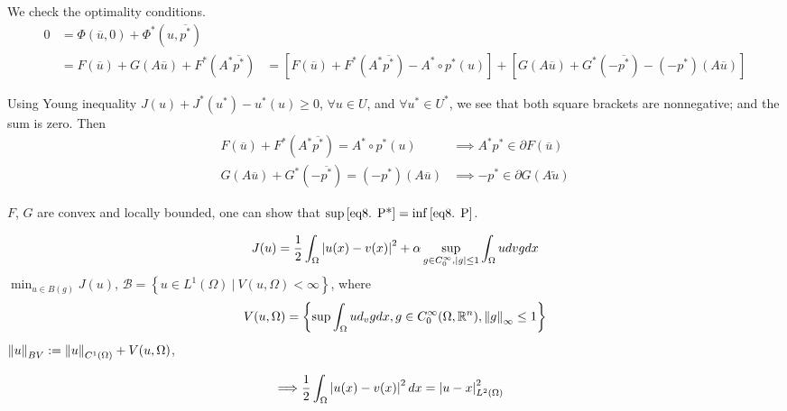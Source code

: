 We check the optimality conditions.
\begin{align*}
	0&=\Phi (\overline{u},0)+\Phi^*(u, \overline{p^*}) \\
	&= F(\overline{u})+G(A\overline{u})+F^*(A^*\overline{p^*})
	&= [F(\overline{u})+F^*(A^*\overline{p^*})-A^*\circ p^*(u)]+[G(A\overline{u})+G^*(-\overline{p^*})-(-p^*)(A\overline{u})]
\end{align*}

Using Young inequality $J(u)+J^*(u^*)-u^*(u)\geq 0$, $\forall u \in U$, and $\forall u^* \in U^*$, we see that both square brackets are nonnegative; and the sum is zero. Then
\begin{align*}
	F(\overline{u})+F^*(A^*\overline{p^*})=A^*\circ p^*(u) &\implies A^*p^* \in \partial F(\overline{u}) \\
	G(A\overline{u})+G^*(-\overline{p^*})=(-p^*)(A\overline{u}) &\implies -p^* \in \partial G(A\overleftarrow{u})
\end{align*}

$F$, $G$ are convex and locally bounded, one can show that 
$\sup\eqref{eq8. P*}=\inf\eqref{eq8. P}$.
\begin{example}
	\begin{equation}
		J(u)=\frac{1}{2} \int_{\Omega}\left|u(x)-v(x)\right|^2+\alpha \sup_{g\in C_0^\infty, \left|g\right|\leq 1} \int_{\Omega} u dv g dx
	\end{equation}
	$\min_{u\in B(g)} J(u)$, $\mathcal{B}=\left\lbrace u\in L^1(\Omega) \ | \ V(u, \Omega) < \infty\right\rbrace$, where
	\begin{equation}
		V(u, \Omega)=\left\lbrace 
		\sup \int_{\Omega} u d_v g dx, g \in C_0^\infty (\Omega, \mathbb{R}^n), \left\lVert g\right\rVert_\infty \leq 1
		\right\rbrace
	\end{equation}
	$\left\lVert u\right\rVert_{BV}:= \left\lVert u\right\rVert_{C^1(\Omega)}+V(u, \Omega)$,
	
	\begin{align}
		\implies & \frac{1}{2}\int_{\Omega} \left|u(x)-v(x)\right|^2 dx = \left|u-x\right|_{L^2(\Omega)}^2
	\end{align}
\end{example}